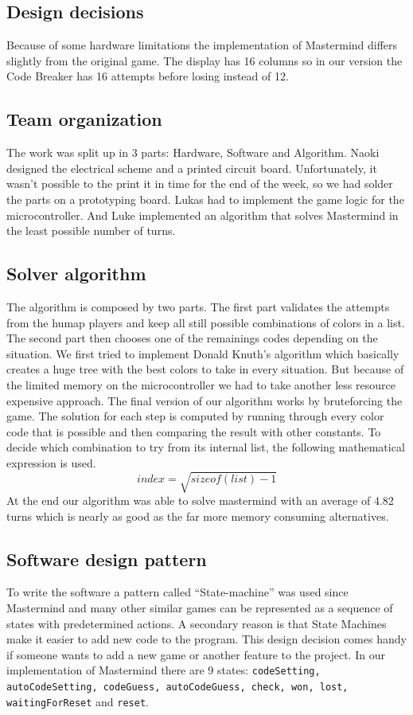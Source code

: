 \documentclass[a4paper, 11pt]{article}
\begin{document}
\subsection{Design decisions}
Because of some hardware limitations the implementation of Mastermind differs
slightly from the original game. The display has 16 columns so in our version
the Code Breaker has 16 attempts before losing instead of 12.

\subsection{Team organization}
The work was split up in 3 parts: Hardware, Software and Algorithm.
Naoki designed the electrical scheme and a printed circuit board.
Unfortunately, it wasn’t possible to the print it in time for the end of
the week, so we had solder the parts on a prototyping board. Lukas had
to implement the game logic for the microcontroller. And Luke
implemented an algorithm that solves Mastermind in the least possible
number of turns. 

\subsection{Solver algorithm}
The algorithm is composed by two parts. The first part validates the attempts
from the humap players and keep all still possible combinations of colors in a
list. The second part then chooses one of the remainings codes depending on
the situation. We first tried to implement Donald Knuth's algorithm
\cite{knuth} which basically creates a huge tree with the best colors to take
in every situation. But because of the limited memory on the microcontroller
we had to take another less resource expensive approach.  The final version of
our algorithm works by bruteforcing the game. The solution for each step is
computed by running through every color code that is possible and then
comparing the result with other constants.  To decide which combination to try
from its internal list, the following mathematical expression is used.  $$
index = \sqrt{sizeof(list) -1} $$ At the end our algorithm was able to solve
mastermind with an average of 4.82 turns which is nearly as good as the far
more memory consuming alternatives.

\subsection{Software design pattern}
To write the software a pattern called “State-machine” \cite{wikistatepattern}\cite{wikistatemachine} was used
since Mastermind and many other similar games can be represented as a
sequence of states with predetermined actions. A secondary reason is
that State Machines make it easier to add new code to the program. This
design decision comes handy if someone wants to add a new game or
another feature to the project. In our implementation of Mastermind
there are 9 states: {\tt codeSetting, autoCodeSetting, codeGuess,
autoCodeGuess, check,  won, lost, waitingForReset} and {\tt reset}.
\end{document}
